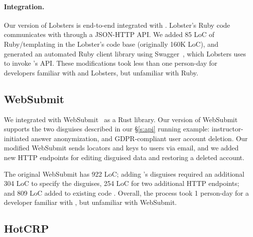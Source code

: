 \paragraph{Integration.}
%
Our version of Lobsters is end-to-end integrated with \sys.
%
Lobster's Ruby code communicates with \sys through a JSON-HTTP API.
%
We added 85 LoC of Ruby/templating in the Lobster's code base (originally 160K LoC), and generated an
automated Ruby client library using Swagger~\cite{swagger}, which Lobsters uses to invoke \sys's
API.
%
These modifications took less than one person-day for developers familiar with
\sys and Lobsters, but unfamiliar with Ruby.

\subsection{WebSubmit}
\label{s:case-websubmit}

%
We integrated \sys with WebSubmit~\cite{websubmit-rs-anon} as a Rust library.
%
Our version of WebSubmit supports the two disguises described in our \S\ref{s:api}
running example: instructor-initiated answer anonymization, and GDPR-compliant
user account deletion.
%
Our modified WebSubmit sends locators and keys to users via email, and we added
new HTTP endpoints for editing disguised data and restoring a deleted account.
%

%
The original WebSubmit has 922 LoC; adding \sys's disguises required an additional 304 LoC
to specify the disguises, 254 LoC for two additional HTTP endpoints; and 809 LoC added to
existing code  .
%
Overall, the process took 1 person-day for a developer familiar with \sys, but
unfamiliar with WebSubmit.
%

\subsection{HotCRP}
\label{s:case-hotcrp}


